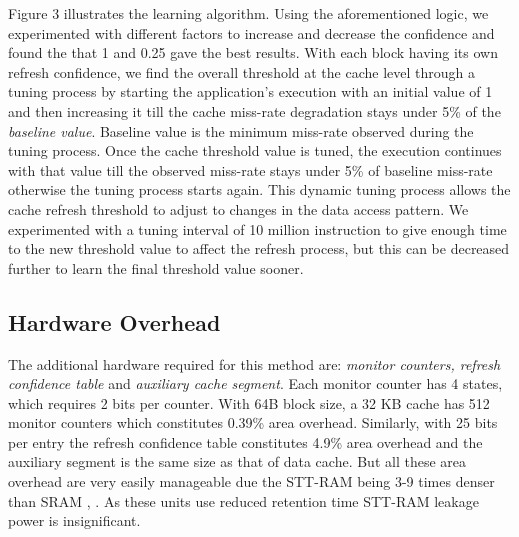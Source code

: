 \documentclass[sigconf]{acmart}
\begin{document}
Figure 3 illustrates the learning algorithm. Using the aforementioned logic, we experimented with different factors to increase and decrease the confidence and found the that 1 and 0.25 gave the best results. With each block having its own refresh confidence, we find the overall threshold at the cache level through a tuning process by starting the application's execution with an initial value of 1 and then increasing it till the cache miss-rate degradation stays under 5\% of the \textit{baseline value}. Baseline value is the minimum miss-rate observed during the tuning process. Once the cache threshold value is tuned, the execution continues with that value till the observed miss-rate stays under 5\% of baseline miss-rate otherwise the tuning process starts again. This dynamic tuning process allows the cache refresh threshold to adjust to changes in the data access pattern. We experimented with a tuning interval of 10 million instruction to give enough time to the new threshold value to affect the refresh process, but this can be decreased further to learn the final threshold value sooner. 



\subsection{Hardware Overhead}
The additional hardware required for this method are: \textit{monitor counters, refresh confidence table} and \textit{auxiliary cache segment}. Each monitor counter has 4 states, which requires 2 bits per counter. With 64B block size, a 32 KB cache has 512 monitor counters which constitutes 0.39\% area overhead. Similarly, with 25 bits per entry the refresh confidence table constitutes 4.9\% area overhead and the auxiliary segment is the same size as that of data cache. But all these area overhead are very easily manageable due the STT-RAM being 3-9 times denser than SRAM \cite{sun}, \cite{cache_revive}. As these units use reduced retention time STT-RAM leakage power is insignificant.
\end{document}
